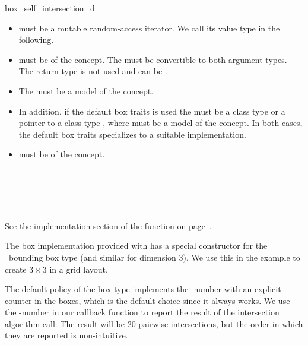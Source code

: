 \begin{ccRefFunction}{box_self_intersection_d}
\begin{itemize}
  \item
     must be a mutable random-access
    iterator. We call its value type  in the following.
  \item
     must be of the  concept. 
    The  must be convertible to both argument types. The
    return type is not used and can be .
  \item
    The  must be a model of the  concept.
  \item
    In addition, if the default box traits is used the  must
    be a class type  or a pointer to a class type , where
     must be a model of the  concept.
    In both cases, the default box traits specializes to a suitable
    implementation.
  \item
     must be of the  concept.
\end{itemize}

\ccSeeAlso

\\

\\
\\

\ccImplementation

See the implementation section of the 
function on page~\pageref{ccRef_CGAL::box_intersection_d}.

\ccExample

The box implementation provided with
 has a special
constructor for the \cgal\ bounding box type  (and
similar for dimension 3). We use this in the example to create $3
\times 3$  in a grid layout.

The default policy of the box type implements the -number with
an explicit counter in the boxes, which is the default choice since it
always works. We use the -number in our callback function to
report the result of the intersection algorithm call. The result will
be 20 pairwise intersections, but the order in which they are reported
is non-intuitive.


\end{ccRefFunction}


